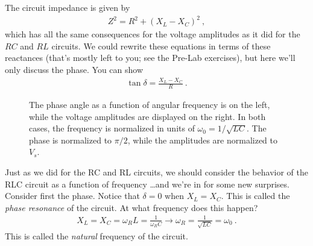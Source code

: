 \documentclass[12pt]{article}
\begin{document}
The circuit impedance is given by
\begin{gather*}
  Z^2 = R^2 + \left(X_L-X_C\right)^2\ ,
\end{gather*}
which has all the same consequences for the voltage amplitudes as it
did for the $RC$ and $RL$ circuits.  We could rewrite these equations
in terms of these reactances (that's mostly left to you; see the
Pre-Lab exercises), but here we'll only discuss the phase.  You can
show
\begin{gather*}
  \tan \delta = \frac{X_L - X_C}{R}\ .
\end{gather*}

\begin{figure}
  \centering
  \subfloat[][Phases]{
  }
  \caption{The phase angle as a function of angular frequency is on
    the left, while the voltage amplitudes are displayed on the right.
    In both cases, the frequency is normalized in units of $\omega_0 =
    1/\sqrt{LC}$.  The phase is normalized to $\pi/2$, while the
    amplitudes are normalized to $V_s$.}
  \label{fig:frequency}
\end{figure}
Just as we did for the RC and RL circuits, we should consider the
behavior of the RLC circuit as a function of frequency \ldots and
we're in for some new surprises. Consider first the phase.  Notice
that $\delta=0$ when $X_L = X_C$.  This is called the \textit{phase
  resonance} of the circuit.  At what frequency does this happen?
\begin{gather*}
  X_L = X_C = \omega_R L = \frac{1}{\omega_R C} \longrightarrow
  \omega_R = \frac{1}{\sqrt{LC}} = \omega_0\ .
\end{gather*}
This is called the \textit{natural} frequency of the circuit.  
\end{document}
